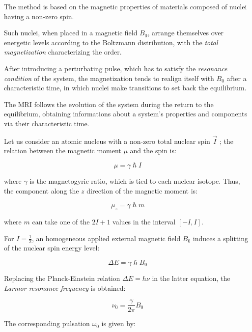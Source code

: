 \documentclass[12pt,openright,twoside,a4paper]{book}
\begin{document}
The method is based on the magnetic properties of materials composed of nuclei having a non-zero spin.

Such nuclei, when placed in a magnetic  field $B_0$, arrange themselves over energetic levels according to the Boltzmann distribution, with the \textit{total magnetization} characterizing the order.
\vspace{5mm}

After introducing a perturbating pulse, which has to satisfy the \textit{resonance condition} of the system, the magnetization tends to realign itself with $B_0$ after a characteristic time, in which nuclei make transitions to set back the equilibrium.

The MRI follows the evolution of the system during the return to the equilibrium, obtaining informations about a system's properties and components via their characteristic time.
\vspace{5mm}

Let us consider an atomic nucleus with a non-zero total nuclear spin $\overrightarrow{I}$ ; the relation between the magnetic moment $\mu$ and the spin is:

\begin{equation}
\mu =\gamma  \hslash I
\end{equation}

where $\gamma$ is the magnetogyric ratio, which is tied to each nuclear isotope. Thus, the component along the $z$ direction of the magnetic moment is:

\begin{equation}
\mu_z =\gamma  \hslash m
\end{equation}

where $m$ can take one of the $2I+1$ values in the interval $[-I, I]$.

For $I=\frac{1}{2}$, an homogeneous applied external magnetic  field $B_0$ induces a splitting of the nuclear spin energy level:

\begin{equation}
\Delta E=\gamma  \hslash B_0
\end{equation}


Replacing the Planck-Einstein relation $\Delta E=h \nu$ in the latter equation, the \textit{Larmor resonance frequency} is obtained:

\begin{equation}
\nu_0=\frac{\gamma}{2\pi}B_0
\end{equation}

The corresponding pulsation $\omega_0$ is given by:
\end{document}

